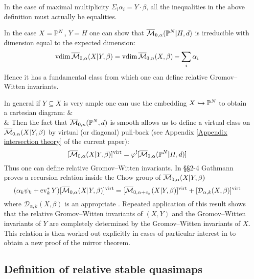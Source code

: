 \begin{remark} In the case of maximal multiplicity $\Sigma_{i} \alpha_i = Y \cdot \beta$, all the inequalities in the above definition must actually be equalities. \end{remark}

In the case $X=\mathbb P^N$, $Y=H$ one can show that $\overline{\mathcal M}_{0,\alpha}(\mathbb P^N|H,d)$ is irreducible with dimension equal to the expected dimension:
\begin{equation*} \operatorname{vdim} \overline{\mathcal M}_{0,\alpha}(X|Y,\beta) = \operatorname{vdim}{\overline{\mathcal M}_{0,n}(X,\beta)} - \sum_i \alpha_i \end{equation*}
Hence it has a fundamental class from which one can define relative Gromov--Witten invariants.

In general if $Y \subseteq X$ is very ample one can use the embedding $X \hookrightarrow \mathbb P^N$ to obtain a cartesian diagram:
\bcd
{} \ar[r] \ar[d]  &  \ar[d] \\
 \ar[r,"\varphi"] & 
\ecd
Then the fact that $\overline{\mathcal M}_{0,n}(\mathbb P^N,d)$ is smooth allows us to define a virtual class on $\overline{\mathcal M}_{0,\alpha}(X|Y,\beta)$ by virtual (or diagonal) pull-back (see Appendix \ref{Appendix intersection theory} of the current paper):
\begin{equation*} [\overline{\mathcal M}_{0,\alpha}(X|Y,\beta)]^{\operatorname{virt}} = \varphi^! [\overline{\mathcal M}_{0,\alpha}(\mathbb P^N|H,d)] \end{equation*}
Thus one can define relative Gromov--Witten invariants. In \S\S 2-4 Gathmann proves a recursion relation inside the Chow group of $\overline{\mathcal M}_{0,\alpha}(X|Y,\beta)$
\begin{equation*} (\alpha_k \psi_k + \operatorname{ev}_k^* Y) [\overline{\mathcal M}_{0,\alpha}(X|Y,\beta)]^{\operatorname{virt}} = [\overline{\mathcal M}_{0,\alpha+e_k}(X|Y,\beta)]^{\operatorname{virt}} + [\mathcal{D}_{\alpha,k}(X,\beta)]^{\operatorname{virt}} \end{equation*}
where $\mathcal{D}_{\alpha,k}(X,\beta)$ is an appropriate . Repeated application of this result shows that the relative Gromov--Witten invariants of $(X,Y)$ and the Gromov--Witten invariants of $Y$ are completely determined by the Gromov--Witten invariants of $X$. This relation is then worked out explicitly in cases of particular interest in \cite{Ga-MF} to obtain a new proof of the mirror theorem.

\subsection{Definition of relative stable quasimaps} \label{Subsection relative stable quasimaps}

